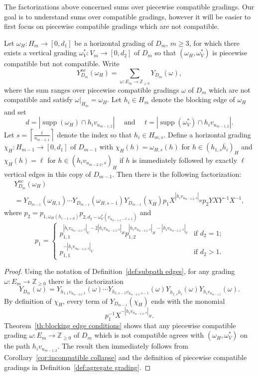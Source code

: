 \documentclass[ALCO,ThmDefs,Unicode,epreuves]{cedram}
\newcommand{\ZZ}{\mathbb{Z}}
\DeclareMathOperator{\supp}{supp}
\begin{document}
The factorizations above concerned sums over piecewise compatible gradings. Our goal is to understand sums over compatible gradings, however it will be easier to first focus on piecewise compatible gradings which are not compatible.
\begin{lemma}
 \label{le:incompatible factorization 1}
 Let $\omega_H:H_m\to[0,d_1]$ be a horizontal grading of $D_m$, $m\ge3$, for which there exists a vertical grading $\omega^*_V:V_m\to[0,d_2]$ of $D_m$ so that $(\omega_H,\omega^*_V)$ is piecewise compatible but not compatible.
 Write 
 \[Y_{D_m}^{nc}(\omega_H)=\sum\limits_{\omega:E_m\to\ZZ_{\ge0}}Y_{D_m}(\omega),\]
 where the sum ranges over piecewise compatible gradings $\omega$ of $D_m$ which are not compatible and satisfy $\omega|_{H_m}=\omega_H$.
 Let $h_i\in H_m$ denote the blocking edge of $\omega_H$ and set 
 \[d=|\supp(\omega_H)\cap h_iv_{u_{m-1,2}}|\quad\text{ and }\quad t=|\supp(\omega^*_V)\cap h_iv_{u_{m-1,2}}|.\]
 Let $s=\left\lceil\frac{i}{u_{m-1,1}}\right\rceil$ denote the index so that $h_i\in H_{m,s}$.
 Define a horizontal grading $\chi_H:H_{m-1}\to[0,d_1]$ of $D_{m-1}$ with $\chi_H(h)=\omega_{H,s}(h)$ for $h\in (h_{1,s}\overline{h}_i)_H$ and $\chi_H(h)=\ell$ for $h\in (h_iv_{u_{m-2,2},s})_H$ if $h$ is immediately followed by exactly $\ell$ vertical edges in this copy of $D_{m-1}$.
 Then there is the following factorization:
 \begin{multline}
 \label{eq:incompatible factorization 1}
 Y_{D_m}^{nc}(\omega_H)\\
 =Y_{D_{m-1}}(\omega_{H,1})\cdots Y_{D_{m-1}}(\omega_{H,s-1})Y_{D_{m-1}}(\chi_H)p_1X^{|h_iv_{u_{m-2,2},s}|_H} p_2YXY^{-1}X^{-1},
 \end{multline}
 where $p_2=p_{1,\omega_H(h_{i-1+d})}p_{2,d_2-\omega^*_V(v_{u_{m-1,2}-t+1})}$ and
 \[p_1=\begin{cases} p_{1,1}^{|h_iv_{u_{m-2,2},s}|_V-2|h_iv_{u_{m-2,2},s}|_H}p_{1,2}^{|h_iv_{u_{m-2,2},s}|_H-|h_iv_{u_{m-2,2},s}|_V} & \text{if $d_2=1$;}\\ 
 p_{1,1}^{-|h_iv_{u_{m-2,2},s}|_V} & \text{if $d_2>1$.}\end{cases}\]
\end{lemma}
\begin{proof}
 Using the notation of Definition~\ref{def:subpath edges}, for any grading $\omega:E_m\to\ZZ_{\ge0}$ there is the factorization
 \[
 Y_{D_m}(\omega)=Y_{h_{1,1}v_{u_{m-2,2},1}}(\omega)\cdots Y_{h_{1,s-1}v_{u_{m-2,2},s-1}}(\omega)Y_{h_{1,s}\overline{h}_i}(\omega)Y_{h_iv_{u_{m-1,2}}}(\omega).
 \]
 By definition of $\chi_H$, every term of $Y_{D_{m-1}}(\chi_H)$ ends with the monomial 
 \[
 p_1^{-1}X^{-|h_iv_{u_{m-2,2},s}|_H}.
 \]
 Theorem~\ref{th:blocking edge conditions} shows that any piecewise compatible grading $\omega:E_m\to\ZZ_{\ge0}$ of $D_m$ which is not compatible agrees with $(\omega_H,\omega^*_V)$ on the path $h_iv_{u_{m-1,2}}$.
 The result then immediately follows from Corollary~\ref{cor:incompatible collapse} and the definition of piecewise compatible gradings in Definition~\ref{def:agregate grading}.
\end{proof}
\end{document}
